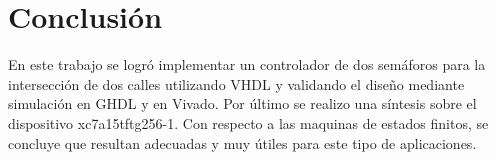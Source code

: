 \documentclass[12pt]{article}
\begin{document}
\hypertarget{conclusion}{%
\section{Conclusión}\label{conclusion}}

En este trabajo se logró implementar un controlador de dos semáforos para la
intersección de dos calles utilizando VHDL y validando el diseño mediante
simulación en GHDL y en Vivado. Por último se realizo una síntesis sobre el
dispositivo xc7a15tftg256-1. Con respecto a las maquinas de estados finitos, se
concluye que resultan adecuadas y muy útiles para este tipo de aplicaciones.
\end{document}
